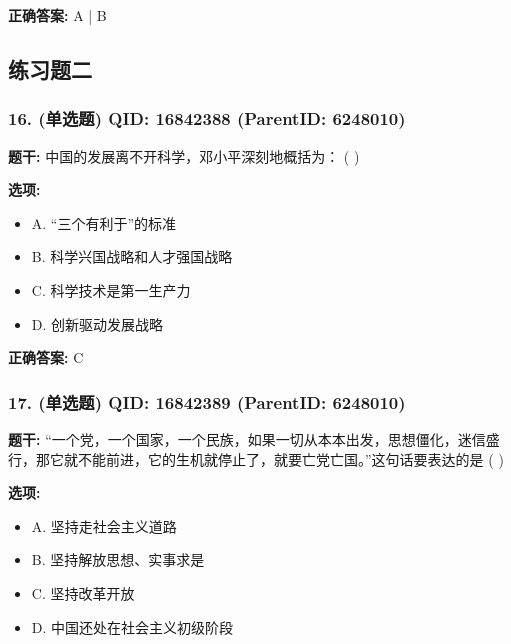 \documentclass[12pt,UTF8]{ctexart}
\begin{document}
\textbf{正确答案:}
A | B

\vspace{0.3em}\hrulefill\vspace{0.7em}

\subsection*{练习题二}

\subsubsection*{16. (单选题) \small QID: 16842388 (ParentID: 6248010)}

\textbf{题干:}
中国的发展离不开科学，邓小平深刻地概括为： ( )



\textbf{选项:}
\begin{itemize}[leftmargin=*]

  \item A. “三个有利于”的标准

  \item B. 科学兴国战略和人才强国战略

  \item C. 科学技术是第一生产力

  \item D. 创新驱动发展战略

\end{itemize}

\textbf{正确答案:}
C

\vspace{0.3em}\hrulefill\vspace{0.7em}

\subsubsection*{17. (单选题) \small QID: 16842389 (ParentID: 6248010)}

\textbf{题干:}
“一个党，一个国家，一个民族，如果一切从本本出发，思想僵化，迷信盛行，那它就不能前进，它的生机就停止了，就要亡党亡国。”这句话要表达的是 ( )



\textbf{选项:}
\begin{itemize}[leftmargin=*]

  \item A. 坚持走社会主义道路

  \item B. 坚持解放思想、实事求是

  \item C. 坚持改革开放

  \item D. 中国还处在社会主义初级阶段

\end{itemize}
\end{document}
